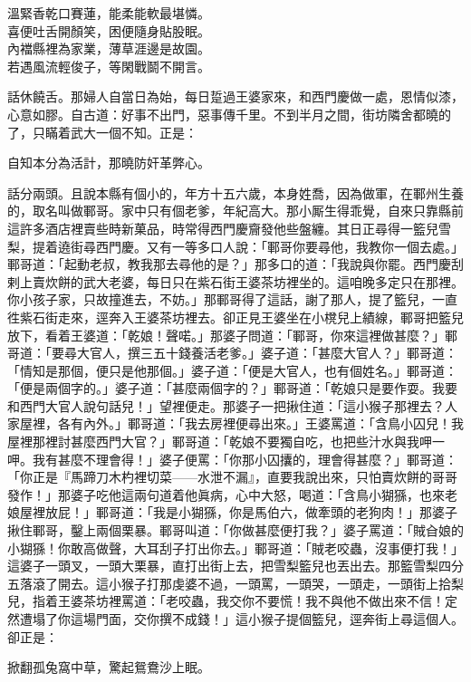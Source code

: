 \begin{myquote} 
溫緊香乾口賽蓮，能柔能軟最堪憐。\\喜便吐舌開顏笑，困便隨身貼股眠。\\內襠縣裡為家業，薄草涯邊是故園。\\若遇風流輕俊子，等閑戰鬬不開言。
\end{myquote} 

話休饒舌。那婦人自當日為始，每日踅過王婆家來，和西門慶做一處，恩情似漆，心意如膠。自古道：好事不出門，惡事傳千里。不到半月之間，街坊隣舍都曉的了，只瞞着武大一個不知。正是：

\begin{myquote} 
自知本分為活計，那曉防奸革弊心。
\end{myquote} 

話分兩頭。且說本縣有個小的，年方十五六歲，本身姓喬，因為做軍，在鄆州生養的，取名叫做鄆哥。家中只有個老爹，年紀高大。那小厮生得乖覺，自來只靠縣前這許多酒店裡賣些時新菓品，時常得西門慶齎發他些盤纏。{}其日正尋得一籃兒雪梨，提着遶街尋西門慶。又有一等多口人說：「鄆哥你要尋他，我教你一個去處。」鄆哥道：「起動老叔，教我那去尋他的是？」那多口的道：「我說與你罷。西門慶刮剌上賣炊餅的武大老婆，每日只在紫石街王婆茶坊裡坐的。這咱晚多定只在那裡。你小孩子家，只故撞進去，不妨。」那鄆哥得了這話，謝了那人，提了籃兒，一直徃紫石街走來，逕奔入王婆茶坊裡去。卻正見王婆坐在小櫈兒上績線，鄆哥把籃兒放下，看着王婆道：「乾娘！聲喏。」那婆子問道：「鄆哥，你來這裡做甚麼？」鄆哥道：「要尋大官人，撰三五十錢養活老爹。」婆子道：「甚麼大官人？」鄆哥道：「情知是那個，便只是他那個。」{}婆子道：「便是大官人，也有個姓名。」鄆哥道：「便是兩個字的。」婆子道：「甚麼兩個字的？」鄆哥道：「乾娘只是要作耍。我要和西門大官人說句話兒！」望裡便走。那婆子一把揪住道：「這小猴子那裡去？人家屋裡，各有內外。」鄆哥道：「我去房裡便尋出來。」王婆罵道：「含鳥小囚兒！我屋裡那裡討甚麼西門大官？」鄆哥道：「乾娘不要獨自吃，也把些汁水與我呷一呷。{}我有甚麼不理會得！」婆子便罵：「你那小囚攮的，理會得甚麼？」鄆哥道：「你正是『馬蹄刀木杓裡切菜——水泄不漏』，直要我說出來，只怕賣炊餅的哥哥發作！」{}那婆子吃他這兩句道着他眞病，心中大怒，喝道：「含鳥小猢猻，也來老娘屋裡放屁！」鄆哥道：「我是小猢猻，你是馬伯六，做牽頭的老狗肉！」{}那婆子揪住鄆哥，鑿上兩個栗暴。鄆哥叫道：「你做甚麼便打我？」婆子罵道：「賊㒲娘的小猢猻！你敢高做聲，大耳刮子打出你去。」鄆哥道：「賊老咬蟲，沒事便打我！」這婆子一頭叉，一頭大栗暴，直打出街上去，把雪梨籃兒也丟出去。那籃雪梨四分五落滾了開去。這小猴子打那虔婆不過，一頭罵，一頭哭，一頭走，一頭街上拾梨兒，{}指着王婆茶坊裡罵道：「老咬蟲，我交你不要慌！我不與他不做出來不信！定然遭塌了你這場門面，交你撰不成錢！」這小猴子提個籃兒，逕奔街上尋這個人。卻正是：

\begin{myquote} 
掀翻孤兔窩中草，驚起鴛鴦沙上眠。{}
\end{myquote} 

